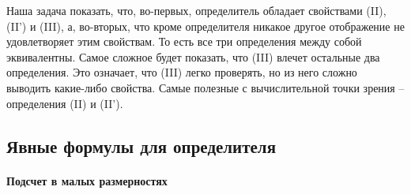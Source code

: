 Наша задача показать, что, во-первых, определитель обладает свойствами  (II), (II') и (III), а, во-вторых, что кроме определителя никакое другое отображение не удовлетворяет этим свойствам.
То есть все три определения между собой эквивалентны.
Самое сложное будет показать, что (III) влечет остальные два определения.
Это означает, что (III) легко проверять, но из него сложно выводить какие-либо свойства.
Самые полезные с вычислительной точки зрения -- определения (II) и (II').


\subsection{Явные формулы для определителя}

\paragraph{Подсчет в малых размерностях}

